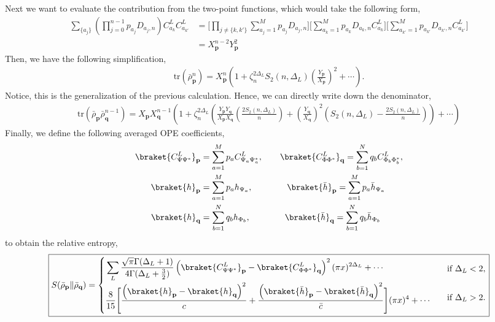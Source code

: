 \documentclass[11pt]{article}
\newcommand{\lb}{\left(}
\newcommand{\rb}{\right)}
\begin{document}
Next we want to evaluate the contribution from the two-point functions, which would take the following form,
\begin{align}
    \sum_{\{a_j\}} \lb \prod_{j=0}^{n-1}p_{a_j} D_{a_j,n} \rb C_{a_k}^L C_{a_{k'}}^L &= \Big[\prod_{j\neq \{k,k'\}}\sum_{a_j = 1}^M p_{a_j}D_{a_j,n} \Big] \Big[ \sum_{a_k = 1}^M p_{a_k} D_{a_k,n} C_{a_k}^L  \Big]\Big[ \sum_{a_{k'} = 1}^M p_{a_{k'}} D_{a_{k'},n} C_{a_{k'}}^L  \Big] \\
    &= X_\textbf{p}^{n-2} Y_\textbf{p}^2
\end{align}
Then, we have the following simplification,
\begin{align}
    \text{tr}(\bar{\rho}_\textbf{p}^n) = X_\textbf{p}^n\lb 1+ \zeta_n^{2\Delta_L}S_2(n,\Delta_L) \lb \frac{Y_\textbf{p}}{X_\textbf{p}} \rb^2 + \cdots \rb. 
\end{align}
Notice, this is the generalization of the previous calculation. 
Hence, we can directly write down the denominator,
\begin{align}
    \text{tr} (\bar{\rho}_\textbf{p} \bar{\rho}_\textbf{q}^{n-1}) = X_\textbf{p} X_\textbf{q}^{n-1} \lb 1 + \zeta_n^{2\Delta_L} \lb \frac{Y_\textbf{p} Y_\textbf{q}}{X_\textbf{p}X_\textbf{q}} \lb\frac{2S_2(n,\Delta_L)}{n}\rb + \lb\frac{Y_\textbf{q}}{X_\textbf{q}}\rb^2 \lb S_2(n,\Delta_L) - \frac{2S_2(n,\Delta_L)}{n}\rb \rb  + \cdots \rb
\end{align}
Finally, we define the following averaged OPE coefficients,
\begin{align}
    \braket{C^L_{\Psi \Psi^*}}_\textbf{p} &= \sum_{a=1}^M p_a C_{\Psi_a \Psi_a^*}^L, \qquad \braket{C^L_{\Phi \Phi^*}}_\textbf{q} = \sum_{b=1}^N q_b C_{\Phi_b \Phi_b^*}^L, \\
    \braket{h}_\textbf{p} &= \sum_{a=1}^M p_a h_{\Psi_a}, \qquad  \qquad \braket{\bar{h}}_\textbf{p} = \sum_{a=1}^M p_a \bar h_{\Psi_a} \\
    \braket{h}_\textbf{q} &= \sum_{b=1}^N q_b h_{\Phi_b}, \qquad  \qquad \braket{\bar{h}}_\textbf{q} = \sum_{b=1}^N q_b \bar h_{\Phi_b}
\end{align}
to obtain the relative entropy,
\begin{align}\label{smallx generalMixture_wrt_mixture}
\boxed{
S(\bar{\rho}_{\textbf{p}} \| \bar{\rho}_{\textbf{q}} )
=
\begin{cases}
\begin{aligned}
&\sum_L\frac{\sqrt{\pi}\Gamma(\Delta_L+1)}
{4\Gamma(\Delta_L+\frac32)}
\lb \braket{C^L_{\Psi \Psi^*}}_\textbf{p} - \braket{C^L_{\Phi \Phi^*}}_\textbf{q}\rb^2 (\pi x)^{2\Delta_L}
+\cdots
\end{aligned}
&
\text{if }\Delta_L < 2,
\\[2ex]
\begin{aligned}
&\frac{8}{15}
\Bigg[
\frac{\lb \braket{h}_\textbf{p} -\braket{h}_\textbf{q}\rb^2}{c} 
+\frac{\lb \braket{\bar h}_\textbf{p}-\braket{\bar h}_\textbf{q}\rb^2}{\bar c}
\Bigg]
(\pi x)^4
+\cdots
\end{aligned}
&
\text{if }\Delta_L>2 .
\end{cases}
}
\end{align}
\end{document}
